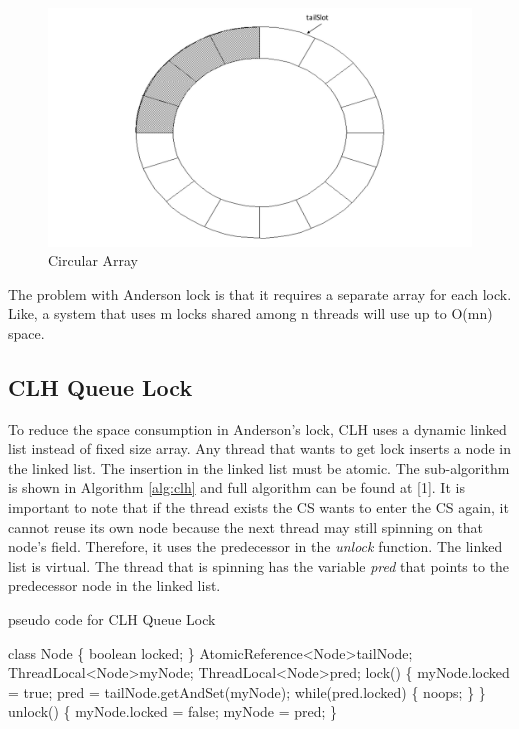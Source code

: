 \documentclass[twoside]{article}
\renewcommand{\cite}[1]{[#1]}
\begin{document}
\begin{figure}[ht]
  \centering
  \includegraphics[height=0.250\textheight,width=0.50\linewidth]{./queuelock.pdf} 
  \caption{Circular Array}
  \label{fig:ql}
\end{figure}



The problem with Anderson lock is that it requires a separate array for each lock. Like, a system that uses m locks shared among n threads will use up to O(mn) space.

\subsection{CLH Queue Lock}

To reduce the space consumption in Anderson's lock, CLH uses a dynamic linked list instead of fixed size array. Any thread that wants to get lock inserts a node in the linked list. The insertion in the linked list must be atomic. The sub-algorithm is shown in Algorithm \ref{alg:clh} and full algorithm can be found at \cite{1}. It is important to note that if the thread exists the CS wants to enter the CS again, it cannot reuse its own node because the next thread may still spinning on that node's field. Therefore, it uses the predecessor in the \textit{unlock} function.
\newline
The linked list is virtual. The thread that is spinning has the variable \textit{pred} that points to the predecessor node in the linked list.
\begin{algorithm}
\caption{pseudo code for CLH Queue Lock}
\begin{algorithmic}[1]
\State class Node \{
\State \indent boolean locked;
\State \}
\State AtomicReference\textless Node\textgreater tailNode;
\State ThreadLocal\textless Node\textgreater myNode;
\State ThreadLocal\textless Node\textgreater pred;
\State lock() \{
\State \indent myNode.locked = true;
\State \indent pred = tailNode.getAndSet(myNode);
\State \indent while(pred.locked) \{ noops; \}
\State \}
\State unlock() \{
\State \indent myNode.locked = false;
\State \indent myNode = pred; 
\State \}
\end{algorithmic}
\label{alg:clh}
\end{algorithm}
\end{document}
